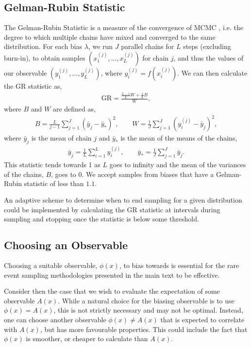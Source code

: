 \documentclass{article}
\begin{document}
\subsection{Gelman-Rubin Statistic}\label{appendix:convergence}
The Gelman-Rubin Statistic is a measure of the convergence of MCMC \cite{roy2020convergence}, i.e. the degree to which multiple chains have mixed and converged to the same distribution.
For each bias $\lambda$, we run $J$ parallel chains for $L$ steps (excluding burn-in), to obtain samples $(x_1^{(j)}, \dots, x_L^{(j)})$ for chain $j$, and
thus the values of our observable $(y_1^{(j)}, \dots, y_L^{(j)})$, where $y_i^{(j)} = f(x_i^{(j)})$.
We can then calculate the GR statistic as,
\begin{align}
    \text{GR} = \frac{\frac{L-1}{L} W + \frac{1}{L}B}{W},
\end{align}
where $B$ and $W$ are defined as,
\begin{align}
    B = \frac{L}{j-1} \sum_{j=1}^J (\bar{y}_j - \bar{y}_*)^2,
    \qquad W = \frac{1}{J} \sum_{j=1}^J \left(y_i^{(j)} - \bar{y}_j \right)^2,
\end{align}
where $\bar{y}_j$ is the mean of chain $j$ and $\bar{y}_*$ is the mean of the means of the chains,
\begin{align}
    \bar{y}_j = \frac{1}{L} \sum_{i=1}^L y_i^{(j)},
    \qquad \bar{y}_* = \frac{1}{J} \sum_{j=1}^J \bar{y}_j.
\end{align}
This statistic tends towards 1 as $L$ goes to infinity and the mean of the variances of the chains, $B$, goes to 0. We accept samples from biases that have a Gelman-Rubin statistic of less than $1.1$.

An adaptive scheme to determine when to end sampling for a given distribution could be implemented by calculating the GR statistic at intervals during sampling and stopping once the statistic is below some threshold.

\subsection{Choosing an Observable}
Choosing a suitable observable, $\phi(x)$, to bias towards is essential for the rare event sampling methodologies presented in the main text to be effective.

Consider then the case that we wish to evaluate the expectation of some observable $A(x)$. While a natural choice for the biasing observable is to use $\phi(x) = A(x)$, this is not strictly necessary and
may not be optimal. Instead, one can choose another observable $\phi(x) \neq A(x)$ that is expected to correlate with $A(x)$, but has more favourable properties. This could include the fact that
$\phi(x)$ is smoother, or cheaper to calculate than $A(x)$.
\end{document}

